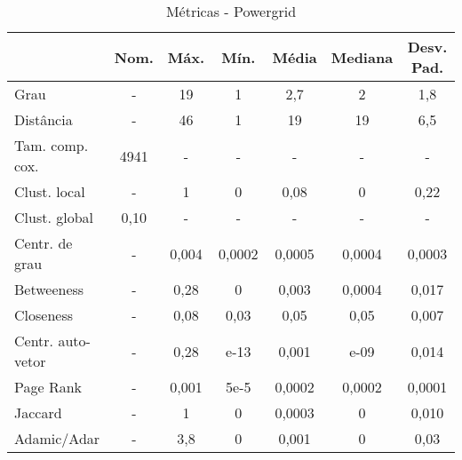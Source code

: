 \documentclass[12pt,a4paper]{article}
\begin{document}
	\begin{table}[H]
		\caption{Métricas - Powergrid}
		\label{tab:powergrid}
		\centering
		\begin{tabular}{l|c|c|c|c|c|c}
			& \textbf{Nom.} & \textbf{Máx.} & \textbf{Mín.} & \textbf{Média} & \textbf{Mediana} & \textbf{Desv. Pad.} \\\hline
			Grau              & -                                 & 19            & 1             & 2,7            & 2                & 1,8                \\ \hline
			Distância         & -                                 & 46            & 1             & 19             & 19               & 6,5                \\ \hline
			Tam. comp. cox.   & 4941                              & -             & -             & -              & -                & -                  \\ \hline
			Clust. local      & -                                 & 1             & 0             & 0,08           & 0                & 0,22               \\ \hline
			Clust. global     & 0,10                              & -             & -             & -              & -                & -                  \\ \hline
			Centr. de grau    & -                                 & 0,004         & 0,0002        & 0,0005         & 0,0004           & 0,0003             \\ \hline
			Betweeness        & -                                 & 0,28          & 0             & 0,003          & 0,0004           & 0,017              \\ \hline
			Closeness         & -                                 & 0,08          & 0,03          & 0,05           & 0,05             & 0,007              \\ \hline
			Centr. auto-vetor & -                                 & 0,28          & e-13          & 0,001          & e-09             & 0,014              \\\hline
			Page Rank         & -                                 & 0,001         & 5e-5          & 0,0002         & 0,0002           & 0,0001             \\\hline
			Jaccard           & -                                 & 1             & 0             & 0,0003         & 0                & 0,010              \\\hline
			Adamic/Adar       & -                                 & 3,8           & 0             & 0,001          & 0                & 0,03              
		\end{tabular}
	\end{table}
	
\end{document}

